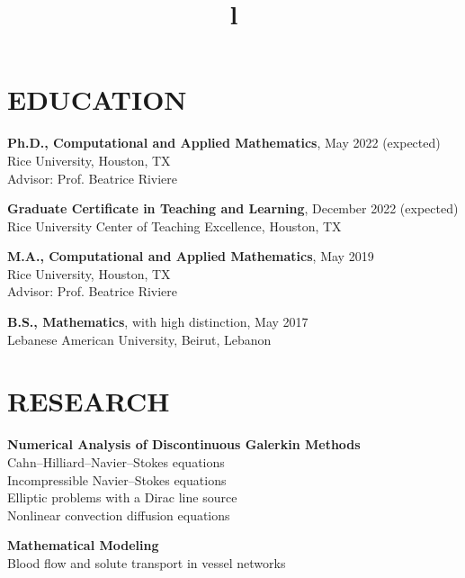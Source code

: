 \documentclass[margin]{res}
\begin{document}
\begin{resume}

\section{EDUCATION}
\textbf{Ph.D., Computational and Applied Mathematics}, May 2022 (expected)\\
Rice University, Houston, TX \\ 
Advisor: Prof. Beatrice Riviere 
\par \textbf{Graduate Certificate in Teaching and Learning}, December 2022 (expected)\\
Rice University Center of Teaching Excellence, Houston, TX 
\par
\textbf{M.A., Computational and Applied Mathematics}, May 2019 \\
Rice University, Houston, TX \\ 
Advisor:  Prof. Beatrice Riviere 
\par
\textbf{B.S., Mathematics}, with high distinction, May 2017\\
Lebanese American University, Beirut, Lebanon 
\section{RESEARCH}
\par
\textbf{Numerical Analysis of Discontinuous Galerkin Methods} \\
Cahn–Hilliard–Navier–Stokes equations \\ 
 Incompressible Navier--Stokes equations   \\ 
 Elliptic problems with a Dirac line source \\ 
Nonlinear convection diffusion equations 

\par 
\textbf{Mathematical Modeling} \\
 Blood flow and solute transport in vessel networks
 
\begin{format}
\title{l}\\
\\
\body\\
\end{format}


\end{resume}
\end{document}
